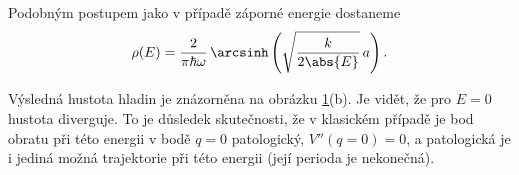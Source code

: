 \begin{solution}
\begin{enumerate}
			Podobným postupem jako v případě záporné energie dostaneme
			\begin{equation*}
				\rho(E)
					=\frac{2}{\pi\hbar\omega}\,\arcsinh\left(\sqrt{\frac{k}{2\abs{E}}}\,a\right).
			\end{equation*}				
		\end{enumerate}
		
		\begin{figure}[!htbp]
			\begin{subfigure}{0.45\linewidth}
				\centering{}
			\end{subfigure}
			\hfill
			\begin{subfigure}{0.45\linewidth}
				\centering{}
			\end{subfigure}
			\label{fig:InverseHarmonicOscillator}
		\end{figure}
		
		Výsledná hustota hladin je znázorněna na obrázku \ref{fig:InverseHarmonicOscillator}(b).
		Je vidět, že pro $E=0$ hustota diverguje.
		To je důsledek skutečnosti, že v klasickém případě je bod obratu při této energii v bodě $q=0$
		patologický, $V''(q=0)=0$, a patologická je i jediná možná trajektorie při této energii (její perioda je nekonečná).
    \end{solution}
